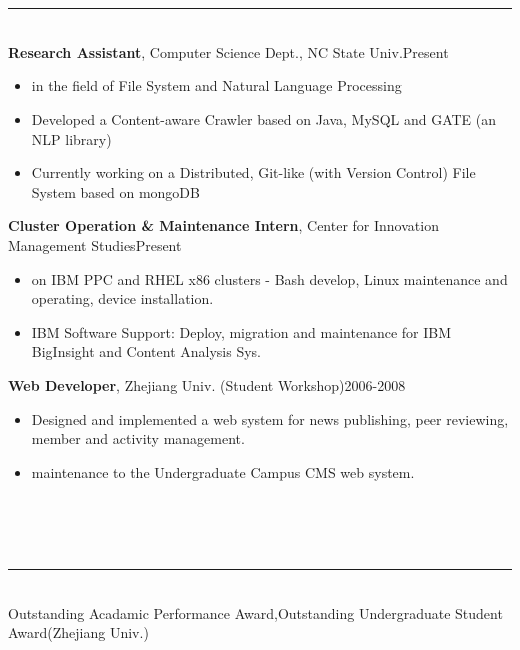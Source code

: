 \documentclass[10pt,oneside,letter,final]{article}
\newenvironment{CVsection}[1]{
    \hspace*{20pt}{\bf \Large #1}\\[-3pt]
    \rule[5pt]{\textwidth}{1pt}\\
}{
    \hspace{-10pt}\hfill\\[10pt]
}
\newenvironment{CVexperience}[3]{
    {\bf #1}, #2\hfill #3\\[2pt]
    \begin{itemize}
        \setlength{\parsep}{0pt}
        \setlength{\itemsep}{0pt}\vspace{-16pt}
}{
    \end{itemize}
}
\begin{document}
    \\[-20pt]                                %
    \begin{CVsection}{\Large E\large XPERIENCE}
        \begin{CVexperience}{Research Assistant}{Computer Science Dept., NC State Univ.}{Present}
            \item in the field of File System and Natural Language Processing
            \item Developed a Content-aware Crawler based on Java, MySQL and GATE (an NLP library)
            \item Currently working on a Distributed, Git-like (with Version Control) File System based on mongoDB 
        \end{CVexperience}
        \begin{CVexperience}{Cluster Operation \& Maintenance Intern}{Center for Innovation Management Studies}{Present}
            \item on IBM PPC and RHEL x86 clusters - Bash develop, Linux maintenance and operating, device installation.
            \item IBM Software Support: Deploy, migration and maintenance for IBM BigInsight and Content Analysis Sys.
        \end{CVexperience}
        
        \begin{CVexperience}{Web Developer}{Zhejiang Univ. (Student Workshop)}{2006-2008}
            \item Designed and implemented a web system for news publishing, peer reviewing, member and activity management.
            \item maintenance to the Undergraduate Campus CMS web system.
        \end{CVexperience}
    \end{CVsection}
    \\[-20pt]
    \begin{CVsection}{\Large H\large ONORS}
        Outstanding Acadamic Performance Award,\quad Outstanding Undergraduate Student Award\hfill (Zhejiang Univ.)
    \end{CVsection}
\end{document}
